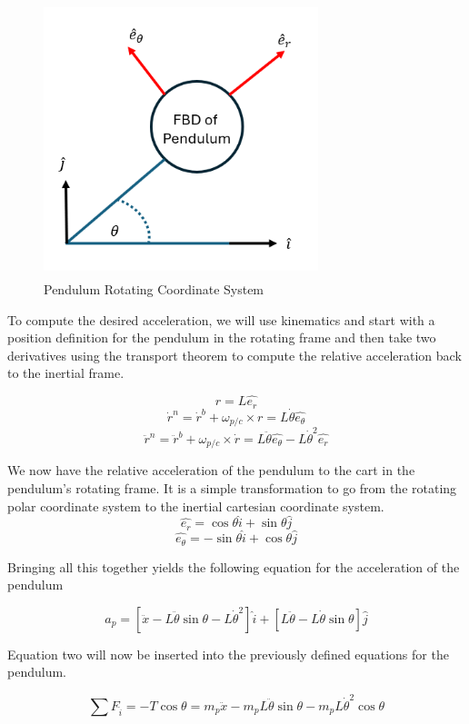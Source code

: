 \documentclass[titlepage]{article}
\begin{document}
\begin{figure}[H]
\center
\includegraphics[width=8cm, height=8cm]{rotating_frame.png}
\caption{Pendulum Rotating Coordinate System}
\end{figure}

To compute the desired acceleration, we will use kinematics and start with a position definition for the pendulum in the rotating frame and then take two derivatives using the transport theorem to compute the relative acceleration back to the inertial frame.

\[r = L\hat{e_{r}}\]
\[\dot{r}^{n} = \dot{r}^{b} + \omega_{p/c} \times r = L\dot{\theta}\hat{e_{\theta}}\]
\[\ddot{r}^{n} = \ddot{r}^{b} + \omega_{p/c} \times \dot{r} = L\ddot{\theta}\hat{e_{\theta}} - L\dot{\theta}^{2}\hat{e_{r}}\]

We now have the relative acceleration of the pendulum to the cart in the pendulum's rotating frame. It is a simple transformation to go from the rotating polar coordinate system to the inertial cartesian coordinate system.
\[\hat{e_{r}} = \cos{\theta} \hat{i} + \sin{\theta} \hat{j}\]
\[\hat{e_{\theta}} = -\sin{\theta} \hat{i} + \cos{\theta} \hat{j}\]

Bringing all this together yields the following equation for the acceleration of the pendulum

\begin{equation}
a_p = \left[\ddot{x} -L\ddot{\theta}\sin{\theta} - L\dot{\theta}^{2}\right]\hat{i} + \left[L\ddot{\theta} - L\dot{\theta}\sin{\theta}\right]\hat{j}
\end{equation}

Equation two will now be inserted into the previously defined equations for the pendulum.

\begin{equation}
\sum{}{F_{\hat{i}}} = -T\cos{\theta} = m_{p}\ddot{x} - m_{p}L\ddot{\theta}\sin{\theta} - m_{p}L\dot{\theta}^{2}\cos{\theta}
\end{equation}
\end{document}
